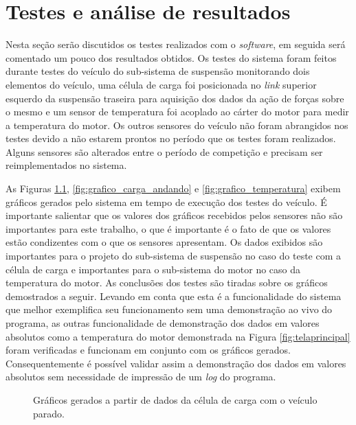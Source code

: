 \chapter{Testes e análise de resultados}
	\label{ch:testes}
Nesta seção serão discutidos os testes realizados com o \textit{software}, em seguida será comentado um pouco dos resultados obtidos. Os testes do sistema foram feitos durante testes do veículo do sub-sistema de suspensão monitorando dois elementos do veículo, uma célula de carga foi posicionada no \textit{link} superior esquerdo da suspensão traseira para aquisição dos dados da ação de forças sobre o mesmo e um sensor de temperatura foi acoplado ao cárter do motor para medir a temperatura do motor. Os outros sensores do veículo não foram abrangidos nos testes devido a não estarem prontos no período que os testes foram realizados. Alguns sensores são alterados entre o período de competição e precisam ser reimplementados no sistema. 

As Figuras \ref{fig:grafico_carga_parado}, \ref{fig:grafico_carga_andando} e \ref{fig:grafico_temperatura} exibem gráficos gerados pelo sistema em tempo de execução dos testes do veículo. É importante salientar que os valores dos gráficos recebidos pelos sensores não são importantes para este trabalho, o que é importante é o fato de que os valores estão condizentes com o que os sensores apresentam. Os dados exibidos são importantes para o projeto do sub-sistema de suspensão no caso do teste com a célula de carga e importantes para o sub-sistema do motor no caso da temperatura do motor. As conclusões dos testes são tiradas sobre os gráficos demostrados a seguir. Levando em conta que esta é a funcionalidade do sistema que melhor exemplifica seu funcionamento sem uma demonstração ao vivo do programa, as outras funcionalidade de demonstração dos dados em valores absolutos como a temperatura do motor demonstrada na Figura \ref{fig:telaprincipal} foram verificadas e funcionam em conjunto com os gráficos gerados. Consequentemente é possível validar assim a demonstração dos dados em valores absolutos sem necessidade de impressão de um \textit{log} do programa.

 \begin{figure}[!htb]
	\center
	\caption{Gráficos gerados a partir de dados da célula de carga com o veículo parado.}
	\qquad
	\label{fig:grafico_carga_parado}
\end{figure}
     

